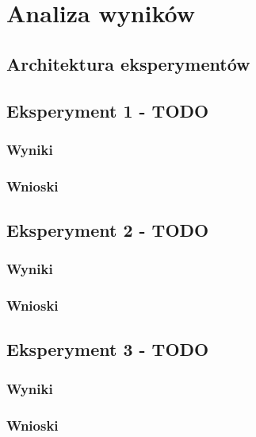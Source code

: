 \chapter{Analiza wyników}

\section{Architektura eksperymentów}

\section{Eksperyment 1 - TODO}

    \subsection{Wyniki}

    \subsection{Wnioski}

\section{Eksperyment 2 - TODO}

    \subsection{Wyniki}

    \subsection{Wnioski}

\section{Eksperyment 3 - TODO}

    \subsection{Wyniki}

    \subsection{Wnioski}